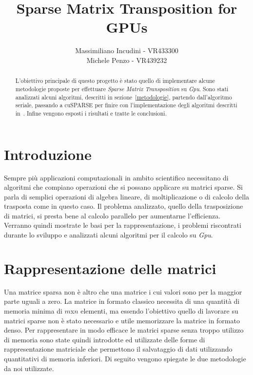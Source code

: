 \documentclass[]{IEEEtran}
\title{Sparse Matrix Transposition for GPUs}
\author{Massimiliano Incudini - VR433300\\Michele Penzo - VR439232}
\begin{document}
\maketitle

\begin{abstract}
	L'obiettivo principale di questo progetto è stato quello di implementare alcune metodologie proposte per effettuare \textit{Sparse Matrix Transposition} su \textit{Gpu}.
	Sono stati analizzati alcuni algoritmi, descritti in sezione~\ref{metodologie}, partendo dall'algoritmo seriale, passando a cuSPARSE per finire con l'implementazione degli algoritmi descritti in~\cite{parallelTrans}.
	Infine vengono esposti i risultati e tratte le conclusioni.
\end{abstract}


\section{Introduzione}
\label{introduzione}
	Sempre più applicazioni computazionali in ambito scientifico necessitano di algoritmi che compiano operazioni che si possano applicare su matrici sparse. Si parla di semplici operazioni di algebra lineare, di moltiplicazione o di calcolo della trasposta come in questo caso.\newline
	Il problema analizzato, quello della trasposizione di matrici, si presta bene al calcolo parallelo per aumentarne l'efficienza. Verranno quindi mostrate le basi per la rappresentazione, i problemi riscontrati durante lo sviluppo e analizzati alcuni algoritmi per il calcolo su \textit{Gpu}.\newline


\section{Rappresentazione delle matrici}
\label{rappresentazione}
	Una matrice sparsa non è altro che una matrice i cui valori sono per la maggior parte uguali a zero. La matrice in formato classico necessita di una quantità di memoria minima di $ m $x$ n $ elementi, ma essendo l'obiettivo quello di lavorare su matrici sparse non è stato necessario e utile memorizzare la matrice in formato denso.\newline
	Per rappresentare in modo efficace le matrici sparse senza troppo utilizzo di memoria sono state quindi introdotte ed utilizzate delle forme di rappresentazione matriciale che permettono il salvataggio di dati utilizzando quantitativi di memoria inferiori.\newline
	Di seguito vengono spiegate le due metodologie da noi utilizzate.
	
\end{document}
